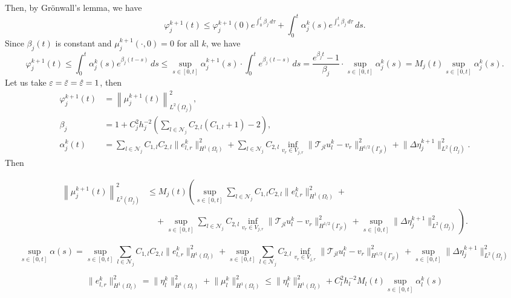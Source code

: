 \documentclass[a4paper, 11pt]{article}
\theoremstyle{plain}
\theoremstyle{definition}
\theoremstyle{remark}
\begin{document}
Then, by Grönwall's lemma, we have
\begin{equation*}
    \varphi_{j}^{k+1}(t) \leq \varphi_{j}^{k+1}(0)e^{\int_{0}^{t}\beta_{j}\, d\tau} + \int_{0}^{t}\alpha_{j}^{k}(s)e^{\int_{s}^{t}\beta_{j}\, d\tau}\,ds.
\end{equation*}
Since $\beta_{j}(t)$ is constant and $\mu_{j}^{k+1}(\cdot, 0) = 0$ for all $k$, we have
\begin{equation*}
    \varphi_{j}^{k+1}(t) \leq \int_{0}^{t}\alpha_{j}^{k}(s)e^{\beta_{j}(t-s)}\,ds \leq \sup_{s\in[0, t]}\alpha_{j}^{k+1}(s)\cdot\int_{0}^{t}e^{\beta_{j}(t-s)}\,ds = \dfrac{e^{\beta_{j} t} - 1}{\beta_{j}}\cdot\sup_{s\in[0, t]}\alpha_{j}^{k}(s) = M_{j}(t)\sup_{s\in[0, t]}\alpha_{j}^{k}(s).
\end{equation*}
Let us take $\varepsilon = \Tilde{\varepsilon} = \hat{\varepsilon} = 1$, then
\begin{align*}
    \varphi_{j}^{k+1}(t) &= \left\lVert \mu_{j}^{k+1}(t)\right\rVert^{2}_{L^{2}(\Omega_{j})},\\
    \beta_{j} &= 1 + C_{j}^{2}h^{-2}_{j}\left(\sum_{l\in \mathcal{N}_{j}}C_{2, l}\left(C_{1, l} + 1\right) - 2\right
    ),\\
    \alpha_{j}^{k}(t) &= \sum_{l\in \mathcal{N}_{j}}C_{1, l}C_{2, l}\lVert e_{l, r}^{k} \rVert^{2}_{H^{1}(\Omega_{l})} + \sum_{l\in \mathcal{N}_{j}}C_{2, l}\inf_{v_{r}\in V_{j, r}}\lVert \mathcal{T}_{jl}u_{l}^{k} -  v_{r} \rVert^{2}_{H^{1/2}(\Gamma_{jl})} + \lVert \Delta\eta_{j}^{k+1} \rVert^{2}_{L^{2}(\Omega_{j})}.
\end{align*}
Then

\begin{align*}
    \left\lVert \mu_{j}^{k+1}(t)\right\rVert^{2}_{L^{2}(\Omega_{j})} &\leq M_{j}(t)\left(\sup_{s\in[0, t]}\sum_{l\in \mathcal{N}_{j}}C_{1, l}C_{2, l}\lVert e_{l, r}^{k} \rVert^{2}_{H^{1}(\Omega_{l})} + \right.\\
    &\quad + \left.\sup_{s\in[0, t]}\sum_{l\in \mathcal{N}_{j}}C_{2, l}\inf_{v_{r}\in V_{j, r}}\lVert \mathcal{T}_{jl}u_{l}^{k} -  v_{r} \rVert^{2}_{H^{1/2}(\Gamma_{jl})} + \sup_{s\in[0, t]}\lVert \Delta\eta_{j}^{k+1} \rVert^{2}_{L^{2}(\Omega_{j})}\right).
\end{align*}

\begin{equation*}
    \sup_{s\in[0, t]}\alpha(s) = \sup_{s\in[0, t]}\sum_{l\in \mathcal{N}_{j}}C_{1, l}C_{2, l}\lVert e_{l, r}^{k} \rVert^{2}_{H^{1}(\Omega_{l})} + \sup_{s\in[0, t]}\sum_{l\in \mathcal{N}_{j}}C_{2, l}\inf_{v_{r}\in V_{j, r}}\lVert \mathcal{T}_{jl}u_{l}^{k} -  v_{r} \rVert^{2}_{H^{1/2}(\Gamma_{jl})} + \sup_{s\in[0, t]}\lVert \Delta\eta_{j}^{k+1} \rVert^{2}_{L^{2}(\Omega_{j})}
\end{equation*}


\begin{equation*}
    \lVert e_{l, r}^{k} \rVert^{2}_{H^{1}(\Omega_{l})} = \lVert \eta_{l}^{k} \rVert^{2}_{H^{1}(\Omega_{l})} + \lVert \mu_{l}^{k} \rVert^{2}_{H^{1}(\Omega_{l})} \leq \lVert \eta_{l}^{k} \rVert^{2}_{H^{1}(\Omega_{l})} + C^{2}_{l}h^{-2}_{l}M_{l}(t)\sup_{s\in[0, t]}\alpha_{l}^{k}(s)
\end{equation*}
\end{document}
